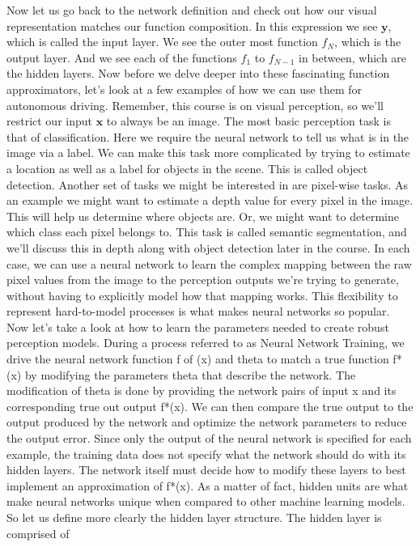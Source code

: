 Now let us go back to the network definition and check out how our visual representation
matches our function composition. In this expression we see $\mathbf{y}$,
which is called the input layer. We see the outer most function $f_{N}$,
which is the output layer. And we see each of the functions
$f_1$ to $f_{N-1}$ in between, which are the hidden layers. Now before we delve deeper into these
fascinating function approximators, let's look at a few examples of how we
can use them for autonomous driving. Remember, this course is
on visual perception, so we'll restrict our input
$\mathbf{x}$ to always be an image. The most basic perception task
is that of classification. Here we require the neural network to
tell us what is in the image via a label. We can make this task more complicated
by trying to estimate a location as well as a label for objects in the scene. This is called object detection. Another set of tasks we might be
interested in are pixel-wise tasks. As an example we might want to estimate a
depth value for every pixel in the image. This will help us determine
where objects are. Or, we might want to determine
which class each pixel belongs to. This task is called semantic segmentation,
and we'll discuss this in depth along with
object detection later in the course. In each case, we can use a neural network
to learn the complex mapping between the raw pixel values from the image
to the perception outputs we're trying to generate, without having to
explicitly model how that mapping works. This flexibility to represent
hard-to-model processes is what makes neural networks so popular. Now let's take a look at how to learn
the parameters needed to create robust perception models. During a process referred to
as Neural Network Training, we drive the neural network function f of
(x) and theta to match a true function f*(x) by modifying the parameters
theta that describe the network. The modification of theta is done by
providing the network pairs of input x and its corresponding true out output f*(x). We can then compare the true output to
the output produced by the network and optimize the network parameters
to reduce the output error. Since only the output of the neural
network is specified for each example, the training data does not specify what
the network should do with its hidden layers. The network itself must decide how
to modify these layers to best implement an approximation of f*(x). As a matter of fact, hidden units are what
make neural networks unique when compared to other machine learning models. So let us define more clearly
the hidden layer structure. The hidden layer is comprised of
